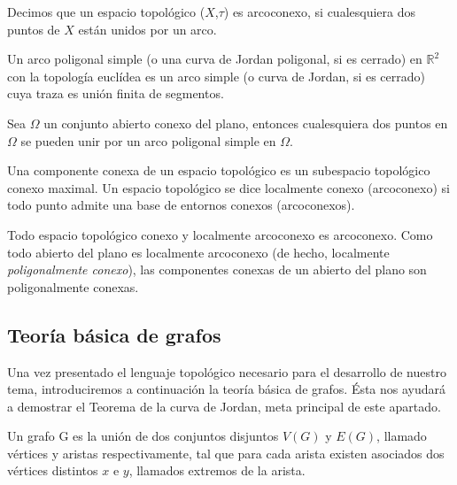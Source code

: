 \begin{definition}
	Decimos que un espacio topológico ($X$,$\tau$) es arcoconexo, si cualesquiera dos puntos de $X$ están unidos por un arco.
\end{definition}

\begin{definition}
	Un arco poligonal simple (o una curva de Jordan poligonal, si es cerrado) en $\mathbb{R}^2$ con la topología euclídea es un arco simple (o curva de Jordan, si es cerrado) cuya traza es  unión finita de segmentos.
\end{definition}

\begin{lemma}
	Sea $\Omega$ un conjunto abierto conexo del plano, entonces cualesquiera dos puntos en $\Omega$ se pueden unir por un arco poligonal simple en $\Omega$. 
\end{lemma}

\begin{definition}
	Una componente conexa de un espacio topológico es un subespacio topológico conexo maximal. Un espacio topológico se dice localmente conexo (arcoconexo) si todo punto admite una base de entornos conexos (arcoconexos). 
\end{definition}
\begin{lemma}
Todo espacio topológico conexo y localmente arcoconexo es arcoconexo. Como todo abierto del plano es localmente arcoconexo (de hecho, localmente {\em poligonalmente conexo}), las componentes conexas de un abierto del plano son poligonalmente conexas. 
\end{lemma}

\subsection{Teoría básica de grafos}

Una vez presentado el lenguaje topológico necesario para el desarrollo de nuestro tema, introduciremos a continuación la teoría básica de grafos. Ésta nos ayudará a demostrar el Teorema de la curva de Jordan, meta principal de este apartado.

\begin{definition}
	Un grafo G es la unión de dos conjuntos disjuntos $V(G)$ y $E(G)$, llamado vértices y aristas respectivamente, tal que para cada arista existen asociados dos vértices distintos $x$ e $y$, llamados extremos de la arista.
\end{definition}



